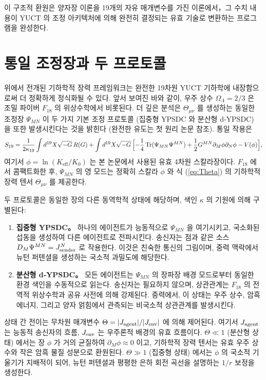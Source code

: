 \documentclass[12pt,a4paper]{article}
\DeclareMathOperator{\Tr}{Tr}
\begin{document}
	이 구조적 환원은 양자장 이론을 19개의 자유 매개변수를 가진 이론에서，그 수치 내용이 YUCT 의 조정 아키텍처에 의해 완전히 결정되는 유효 기술로 변환하는 프로그램을 완성한다.
	
	\section{통일 조정장과 두 프로토콜}
	\label{sec:unified-protocols}
	
	위에서 전개된 기하학적 장력 프레임워크는 완전한 19차원 YUCT 기하학에 내장함으로써 더 정확하게 정식화될 수 있다. 앞서 보여진 바와 같이, 우주 상수 \(\Omega_\Lambda=2/3\) 은 조밀 파이버 \(F_{18}\) 의 위상수학에서 비롯된다. 더 깊은 분석은 \(\Theta_{\mu\nu}\) 를 생성하는 동일한 조정장 \(\Psi_{MN}\) 이 두 가지 기본 조정 프로토콜 (집중형 YPSDC 와 분산형 d‑YPSDC) 을 또한 발생시킨다는 것을 밝힌다 (완전한 유도는 첫 원리 논문 참조). 통일 작용은
	\begin{equation}
		S_{19} = \frac{1}{2\kappa_{19}} \int d^{19}X \sqrt{-G}\, R(G)
		+ \int d^{19}X \sqrt{-G}\,
		\Bigl[ -\frac14 \Tr(\Psi_{MN}\Psi^{MN})
		+ \frac12 G^{MN}\partial_M\phi \partial_N\phi
		- V(\phi) \Bigr],
		\label{eq:unified-gravity}
	\end{equation}
	여기서 \(\phi = \ln(K_{\mathrm{eff}}/K_0)\) 는 본 논문에서 사용된 유효 4차원 스칼라장이다. \(F_{18}\) 에서 콤팩트화한 후, \(\Psi_{MN}\) 의 영 모드는 정확히 스칼라 \(\phi\) 와 식 (\ref{eq:Theta}) 의 기하학적 장력 텐서 \(\Theta_{\mu\nu}\) 를 제공한다.
	
	두 프로토콜은 동일한 장의 다른 동역학적 상태에 해당하며, 색인 \(\kappa\) 의 기원에 의해 구별된다:
	\begin{enumerate}[leftmargin=*]
		\item \textbf{집중형 YPSDC。} 하나의 에이전트가 능동적으로 \(\Psi_{MN}\) 을 여기시키고, 국소화된 섭동을 생성하여 다른 에이전트로 전파시킨다. 송신자는 점과 같은 소스 \(D_M\Psi^{MN} = J^N_{\rm sender}\) 로 작용한다. 이것은 친숙한 통신의 그림이며, 중력 맥락에서 뉴턴 퍼텐셜을 생성하는 국소적 과밀도에 해당한다.
		\item \textbf{분산형 d‑YPSDC。} 모든 에이전트는 \(\Psi_{MN}\) 의 장파장 배경 모드로부터 동일한 환경 색인을 수동적으로 읽는다. 송신자는 필요하지 않으며, 상관관계는 \(F_{18}\) 의 전역적 위상수학과 공유 사전에 의해 강제된다. 중력에서, 이 상태는 우주 상수, 암흑 에너지, 그리고 양자 얽힘에서 관측되는 비국소적 상관관계를 발생시킨다.
	\end{enumerate}
	
	상태 간 전이는 무차원 매개변수 \(\Theta = |J_{\rm agent}| / |J_{\rm env}|\) 에 의해 제어된다. 여기서 \(J_{\rm agent}\) 는 능동적 송신자의 흐름, \(J_{\rm env}\) 는 우주론적 배경의 유효 흐름이다. \(\Theta\ll1\) (분산형 상태) 에서는 장 \(\phi\) 가 거의 균질하여 \(\partial_M\phi\approx0\) 이고, 기하학적 장력 텐서는 유효 우주 상수와 작은 암흑 물질 성분으로 환원된다. \(\Theta\gg1\) (집중형 상태) 에서는 \(\phi\) 의 국소적 기울기가 지배적이 되어, 뉴턴 퍼텐셜과 평평한 은하 회전 곡선을 설명하는 \(1/r\) 보정을 생성한다.
	
\end{document}
